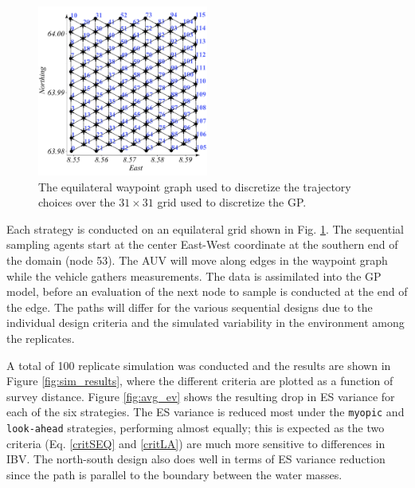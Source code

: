 \documentclass[aoas]{imsart}
\begin{document}
\begin{figure}[h!]
\centering
\includegraphics[width=0.50\textwidth]{Figures/sim/wp_graph_paper.pdf}
\caption{The equilateral waypoint graph used to discretize the
  trajectory choices over the $31\times31$ grid used to discretize the GP.}
\label{fig:wp_graph}
\end{figure}

Each strategy is conducted on an equilateral grid shown in Fig. \ref{fig:wp_graph}. The sequential sampling agents start at the center East-West coordinate at the southern end of the domain (node 53). The AUV will move along edges in the waypoint graph while the vehicle gathers measurements. The data is assimilated into the GP model, before an evaluation of the next node to sample is conducted at the end of the edge. The paths will differ for the various sequential designs due to the individual design criteria and the simulated variability in the environment among the replicates.

A total of 100 replicate simulation was conducted and the results are shown in Figure \ref{fig:sim_results},
where the different criteria are plotted as a function of survey distance. Figure \ref{fig:avg_ev} shows the resulting drop in ES variance for each of the six strategies. The ES variance is reduced most under the \texttt{myopic} and \texttt{look-ahead} strategies, performing almost equally; this is expected as the two criteria (Eq. \eqref{critSEQ} and \eqref{critLA}) are much more sensitive to differences in IBV. The north-south design also does well in terms of ES variance reduction since the path is parallel to the  boundary between the water masses.
\end{document}
